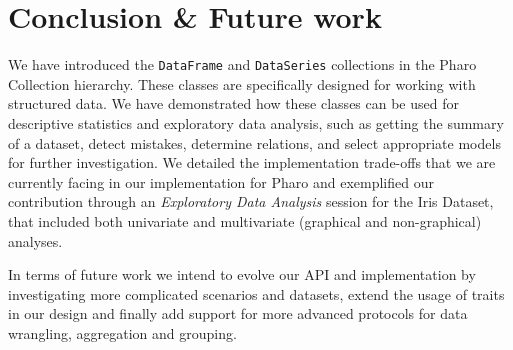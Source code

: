 \documentclass[sigplan]{acmart}
\begin{document}
%
%


%

\section{Conclusion \& Future work}
\label{sec:conclusion}
We have introduced the \texttt{DataFrame} and \texttt{DataSeries} collections in the Pharo Collection hierarchy. These classes are specifically designed for working with structured data. We have demonstrated how these classes can be used for descriptive statistics and exploratory data analysis, such as getting the summary of a dataset, detect mistakes, determine relations, and select appropriate models for further investigation. We detailed the implementation trade-offs that we are currently facing in our implementation for Pharo and exemplified our contribution through an \textit{Exploratory Data Analysis} session for the Iris Dataset, that included both univariate and multivariate (graphical and non-graphical) analyses. 

In terms of future work we intend to evolve our API and implementation by investigating more complicated scenarios and datasets, extend the usage of traits in our design and finally add support for more advanced protocols for data wrangling, aggregation and grouping.
%

\end{document}
